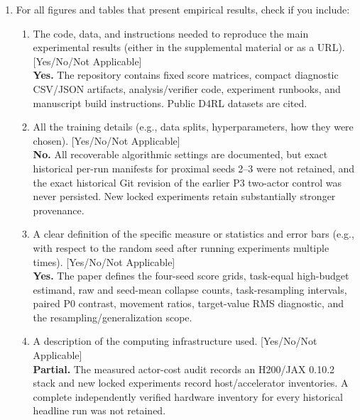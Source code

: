 \begin{enumerate}
\item For all figures and tables that present empirical results, check if you include:
  \begin{enumerate}
  \item The code, data, and instructions needed to reproduce the main experimental results (either in the supplemental material or as a URL). [Yes/No/Not Applicable]\\
  \textbf{Yes.} The repository contains fixed score matrices, compact diagnostic CSV/JSON artifacts, analysis/verifier code, experiment runbooks, and manuscript build instructions. Public D4RL datasets are cited.
  \item All the training details (e.g., data splits, hyperparameters, how they were chosen). [Yes/No/Not Applicable]\\
  \textbf{No.} All recoverable algorithmic settings are documented, but exact historical per-run manifests for proximal seeds 2--3 were not retained, and the exact historical Git revision of the earlier P3 two-actor control was never persisted. New locked experiments retain substantially stronger provenance.
  \item A clear definition of the specific measure or statistics and error bars (e.g., with respect to the random seed after running experiments multiple times). [Yes/No/Not Applicable]\\
  \textbf{Yes.} The paper defines the four-seed score grids, task-equal high-budget estimand, raw and seed-mean collapse counts, task-resampling intervals, paired P0 contrast, movement ratios, target-value RMS diagnostic, and the resampling/generalization scope.
  \item A description of the computing infrastructure used. [Yes/No/Not Applicable]\\
  \textbf{Partial.} The measured actor-cost audit records an H200/JAX 0.10.2 stack and new locked experiments record host/accelerator inventories. A complete independently verified hardware inventory for every historical headline run was not retained.
  \end{enumerate}


\end{enumerate}
